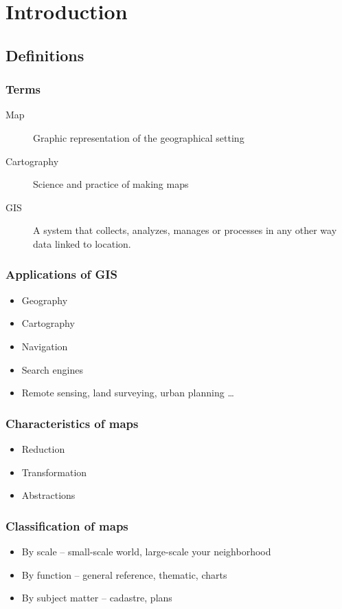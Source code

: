 \documentclass[17pt]{beamer}
\begin{document}
\section{Introduction}

\subsection{Definitions}

\begin{frame}
  \frametitle{Terms}
  \begin{description}
  \item[Map] Graphic representation of the geographical setting
  \item[Cartography] Science and practice of making maps
  \item[GIS] A system that collects, analyzes, manages or processes in any other way data linked to location.
  \end{description}
\end{frame}

\begin{frame}
  \frametitle{Applications of GIS}
  \begin{itemize}
  \item Geography
  \item Cartography
  \item Navigation
  \item Search engines
  \item Remote sensing, land surveying, urban planning \ldots{}
  \end{itemize}
\end{frame}

\begin{frame}
  \frametitle{Characteristics of maps}
  \begin{itemize}
  \item<1-> Reduction 
  \item<3-> Transformation 
  \item<5-> Abstractions 
  \end{itemize}
\end{frame}

\begin{frame}
  \frametitle{Classification of maps}
  \begin{itemize}
  \item By scale -- small-scale world, large-scale your neighborhood
  \item By function -- general reference, thematic, charts
  \item By subject matter -- cadastre, plans
  \end{itemize}
\end{frame}
\end{document}
